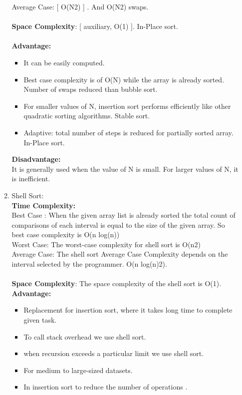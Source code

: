 \documentclass[11pt]{article}
\begin{document}
\begin{enumerate}
\begin{enumerate}
		            Average Case: [ O(N2) ] . And O(N2) swaps.\\\\
		            \textbf{Space Complexity}: [ auxiliary, O(1) ]. In-Place sort.\\\\
		            \textbf{Advantage: }
					\begin{itemize}
						\item It can be easily computed.
						\item Best case complexity is of O(N) while the array is already sorted.
						Number of swaps reduced than bubble sort.
						\item For smaller values of N, insertion sort performs efficiently like other quadratic sorting algorithms.
						Stable sort.
						\item Adaptive: total number of steps is reduced for partially sorted array.
						In-Place sort.
					\end{itemize}
		            \textbf{Disadvantage: }\\
		            It is generally used when the value of N is small. For larger values of N, it is inefficient.
		      \item Shell Sort: \\
		            \textbf{Time Complexity: }\\
		            Best Case : When the given array list is already sorted the total count of comparisons of each interval is equal to the size of the given array. So best case complexity is O(n log(n))\\
		            Worst Case: The worst-case complexity for shell sort is  O(n2)\\
		            Average Case: The shell sort Average Case Complexity depends on the interval selected by the programmer.
		            O(n log(n)2).\\\\
		            \textbf{Space Complexity}: The space complexity of the shell sort is O(1).\\
		            \textbf{Advantage: }
					\begin{itemize}						
						\item Replacement for insertion sort, where it takes long time to complete given task.
						\item To call stack overhead we use shell sort.
						\item when recursion exceeds a particular limit we use shell sort.
						\item For medium to large-sized datasets.
						\item In insertion sort to reduce the  number of operations .
					\end{itemize}
	      \end{enumerate}
\end{enumerate}
\end{document}
